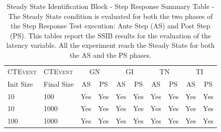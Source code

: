 \begin{table}[h]
\centering
\scriptsize


\begin{tabular}{ll|c|c|c|c|c|c|c|c}
\hline
\textsc{CTEvent}&\textsc{CTEvent}&\multicolumn{2}{c|}{GN}& \multicolumn{2}{c|}{GI}& \multicolumn{2}{c|}{TN}& \multicolumn{2}{c}{TI} \\
 Init Size & Final Size & AS& PS& AS& PS& AS& PS& AS & PS\\ 
\hline
\hline
10 & 100 & Yes& Yes & Yes & Yes & Yes& Yes & Yes & Yes \\ 
10 & 1000& Yes& Yes& Yes & Yes& Yes& Yes& Yes& Yes\\ 
100& 1000& Yes & Yes& Yes & Yes& Yes & Yes& Yes  & Yes\\ 
\hline
\end{tabular}
\caption[Steady State Identification Block - Step Response Summary Table - Latency]{Steady State Identification Block - Step Response Summary Table - The Steady State condition is evaluated for both the two phases of the Step Response Test execution: Ante Step (AS) and Post Step (PS). This tables report the SSIB results for the evaluation of the latency variable. All the experiment reach the Steady State for both the AS and the PS phases.}
\label{tab:ss-step-latency}
\end{table}

